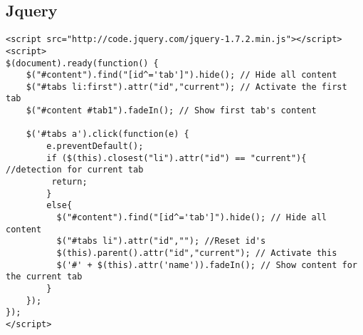 \subsection{Jquery}
\begin{verbatim}
<script src="http://code.jquery.com/jquery-1.7.2.min.js"></script>
<script>
$(document).ready(function() {
    $("#content").find("[id^='tab']").hide(); // Hide all content
    $("#tabs li:first").attr("id","current"); // Activate the first tab
    $("#content #tab1").fadeIn(); // Show first tab's content
    
    $('#tabs a').click(function(e) {
        e.preventDefault();
        if ($(this).closest("li").attr("id") == "current"){ //detection for current tab
         return;       
        }
        else{             
          $("#content").find("[id^='tab']").hide(); // Hide all content
          $("#tabs li").attr("id",""); //Reset id's
          $(this).parent().attr("id","current"); // Activate this
          $('#' + $(this).attr('name')).fadeIn(); // Show content for the current tab
        }
    });
});
</script>
\end{verbatim}